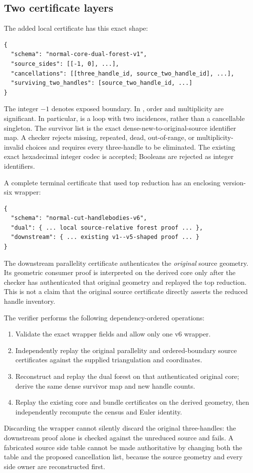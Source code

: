 \subsection{Two certificate layers}

The added local certificate has this exact shape:
\begin{lstlisting}
{
  "schema": "normal-core-dual-forest-v1",
  "source_sides": [[-1, 0], ...],
  "cancellations": [[three_handle_id, source_two_handle_id], ...],
  "surviving_two_handles": [source_two_handle_id, ...]
}
\end{lstlisting}
The integer $-1$ denotes exposed boundary. In , order and
multiplicity are significant. In particular, \code{[0,0]} is a loop with
two incidences, rather than a cancellable singleton. The survivor list is
the exact dense-new-to-original-source identifier map. A checker rejects
missing, repeated, dead, out-of-range, or multiplicity-invalid choices and
requires every three-handle to be eliminated. The existing exact hexadecimal
integer codec is accepted; Booleans are rejected as integer identifiers.

A complete terminal certificate that used top reduction has an enclosing
version-six wrapper:
\begin{lstlisting}
{
  "schema": "normal-cut-handlebodies-v6",
  "dual": { ... local source-relative forest proof ... },
  "downstream": { ... existing v1--v5-shaped proof ... }
}
\end{lstlisting}
The downstream parallelity certificate authenticates the \emph{original}
source geometry. Its geometric consumer proof is interpreted on the derived
core only after the checker has authenticated that original geometry and
replayed the top reduction. This is not a claim that the original source
certificate directly asserts the reduced handle inventory.

The verifier performs the following dependency-ordered operations:
\begin{enumerate}
\item Validate the exact wrapper fields and allow only one v6 wrapper.
\item Independently replay the original parallelity and ordered-boundary
source certificates against the supplied triangulation and coordinates.
\item Reconstruct and replay the dual forest on that authenticated original
core; derive the same dense survivor map and new handle counts.
\item Replay the existing core and bundle certificates on the derived
geometry, then independently recompute the census and Euler identity.
\end{enumerate}
Discarding the wrapper cannot silently discard the original three-handles:
the downstream proof alone is checked against the unreduced source and
fails. A fabricated source side table cannot be made authoritative by
changing both the table and the proposed cancellation list, because the
source geometry and every side owner are reconstructed first.

